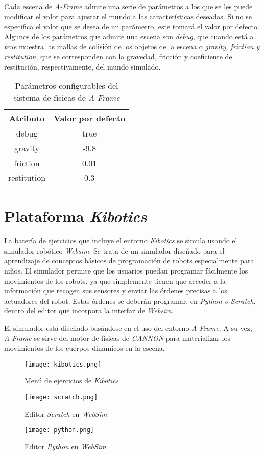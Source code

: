 Cada escena de  \textit{A-Frame}  admite una serie de parámetros a los que se les puede modificar el valor para ajustar el mundo a las características deseadas. Si no se especifica el valor que se desea de un parámetro, este tomará el valor por defecto. Algunos de los parámetros que admite una escena son \textit{debug}, que cuando está a \textit{true} muestra las mallas de colisión de los objetos de la escena o \textit{gravity, friction y restitution}, que se corresponden con la gravedad, fricción y coeficiente de restitución, respectivamente, del mundo simulado.
\begin{table}[h!]
\centering
\begin{tabular}{|c|c|}
\hline
\textbf{Atributo}    & \textbf{Valor por defecto} \\ \hline
debug       & true              \\ \hline
gravity     & -9.8              \\ \hline
friction    & 0.01              \\ \hline
restitution & 0.3               \\ \hline
\end{tabular}
\caption{Parámetros configurables del sistema de físicas de \textit{A-Frame}}
\label{fig:param-fisicas}
\end{table}

\section{Plataforma \textit{Kibotics}}
La batería de ejercicios que incluye el entorno \textit{Kibotics} se simula usando el simulador robótico \textit{Websim}. Se trata de un simulador diseñado para el aprendizaje de conceptos básicos de programación de robots especialmente para niños. El simulador permite que los usuarios puedan programar fácilmente los movimientos de los robots, ya que simplemente tienen que acceder a la información que recogen sus sensores y enviar las órdenes precisas a los actuadores del robot. Estas órdenes se deberán programar, en\textit{ Python o Scratch}, dentro del editor que incorpora la interfaz de \textit{Websim}. \newline

El simulador está diseñado basándose en el uso del entorno \textit{A-Frame}. A su vez, \textit{A-Frame} se sirve del motor de físicas de \textit{CANNON} para materializar los movimientos de los cuerpos dinámicos en la escena.

\begin{figure}[h!]
    \centering
    \texttt{[image: kibotics.png]} 
    \caption{Menú de ejercicios de \textit{Kibotics}}
    \label{fig:kibotics}
\end{figure}

\begin{figure}[h!]
    \centering
    \texttt{[image: scratch.png]} 
    \caption{Editor \textit{Scratch} en \textit{WebSim}}
    \label{fig:scratch}
\end{figure}

\begin{figure}[h!]
    \centering
    \texttt{[image: python.png]} 
    \caption{Editor \textit{Python} en \textit{WebSim}}
    \label{fig:python}
\end{figure}